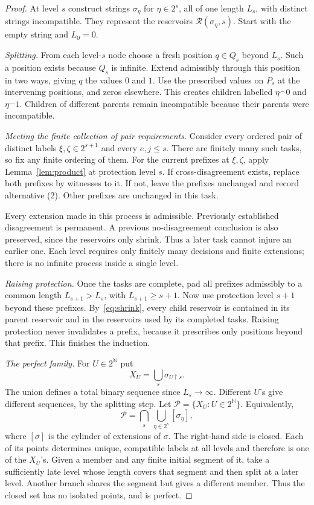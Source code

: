 \documentclass[11pt,a4paper]{article}
\newcommand{\N}{\mathbb N}
\newcommand{\Cantor}{2^{\N}}
\newcommand{\Res}{\mathcal R}
\newcommand{\concat}{\mathbin{{}^\frown}}
\theoremstyle{definition}
\theoremstyle{remark}
\begin{document}
\begin{proof}
At level $s$ construct strings $\sigma_\eta$ for $\eta\in2^s$, all of one
length $L_s$, with distinct strings incompatible. They represent the
reservoirs $\Res(\sigma_\eta,s)$. Start with the empty string and $L_0=0$.

\emph{Splitting.} From each level-$s$ node choose a fresh position
$q\in Q_s$ beyond $L_s$. Such a position exists because $Q_s$ is infinite.
Extend admissibly through this position in two ways, giving $q$ the values
$0$ and $1$. Use the prescribed values on $P_s$ at the intervening
positions, and zeros elsewhere. This creates children labelled
$\eta\concat0$ and $\eta\concat1$. Children of different parents remain
incompatible because their parents were incompatible.

\emph{Meeting the finite collection of pair requirements.}
Consider every ordered pair of distinct labels
$\xi,\zeta\in2^{s+1}$ and every $e,j\le s$. There are finitely many such
tasks, so fix any finite ordering of them. For the current prefixes at
$\xi,\zeta$, apply Lemma~\ref{lem:product} at protection level $s$.
If cross-disagreement exists, replace both prefixes by witnesses to it.
If not, leave the prefixes unchanged and record alternative (2).
Other prefixes are unchanged in this task.

Every extension made in this process is admissible. Previously established
disagreement is permanent. A previous no-disagreement conclusion is also
preserved, since the reservoirs only shrink. Thus a later task cannot
injure an earlier one. Each level requires only finitely many decisions
and finite extensions; there is no infinite process inside a single level.

\emph{Raising protection.} Once the tasks are complete, pad all prefixes
admissibly to a common length $L_{s+1}>L_s$, with $L_{s+1}\ge s+1$.
Now use protection level $s+1$ beyond these prefixes. By~\eqref{eq:shrink},
every child reservoir is contained in its parent reservoir and in the
reservoirs used by its completed tasks. Raising protection never invalidates
a prefix, because it prescribes only positions beyond that prefix.
This finishes the induction.

\emph{The perfect family.} For $U\in\Cantor$ put
\[
 X_U=\bigcup_s\sigma_{U\upharpoonright s}.
\]
The union defines a total binary sequence since $L_s\to\infty$.
Different $U$'s give different sequences, by the splitting step.
Let $\mathcal P=\{X_U:U\in\Cantor\}$. Equivalently,
\[
 \mathcal P=\bigcap_s\ \bigcup_{\eta\in2^s}[\sigma_\eta],
\]
where $[\sigma]$ is the cylinder of extensions of $\sigma$.
The right-hand side is closed. Each of its points determines unique,
compatible labels at all levels and therefore is one of the $X_U$'s.
Given a member and any finite initial segment of it, take a sufficiently
late level whose length covers that segment and then split at a later
level. Another branch shares the segment but gives a different member.
Thus the closed set has no isolated points, and is perfect.


\end{proof}
\end{document}

